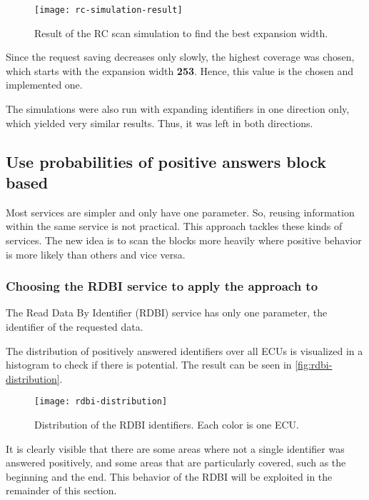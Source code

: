 \begin{figure}[h]
    \centering
    \texttt{[image: rc-simulation-result]}
    \caption{Result of the RC scan simulation to find the best expansion width.}
    \label{fig:rc-simulation-result}
\end{figure}

Since the request saving decreases only slowly, the highest coverage was chosen, which starts with the expansion width \textbf{253}. Hence, this value is the chosen and implemented one.

The simulations were also run with expanding identifiers in one direction only, which yielded very similar results. Thus, it was left in both directions.


\subsection{Use probabilities of positive answers block based}

Most services are simpler and only have one parameter. So, reusing information within the same service is not practical. This approach tackles these kinds of services. The new idea is to scan the blocks more heavily where positive behavior is more likely than others and vice versa.

\subsubsection{Choosing the RDBI service to apply the approach to}

The Read Data By Identifier (RDBI) service has only one parameter, the identifier of the requested data.

The distribution of positively answered identifiers over all ECUs is visualized in a histogram to check if there is potential. The result can be seen in \autoref{fig:rdbi-distribution}.

\begin{figure}[h]
    \centering
    \texttt{[image: rdbi-distribution]}
    \caption{Distribution of the RDBI identifiers. Each color is one ECU.}
    \label{fig:rdbi-distribution}
\end{figure}

It is clearly visible that there are some areas where not a single identifier was answered positively, and some areas that are particularly covered, such as the beginning and the end. This behavior of the RDBI will be exploited in the remainder of this section.

